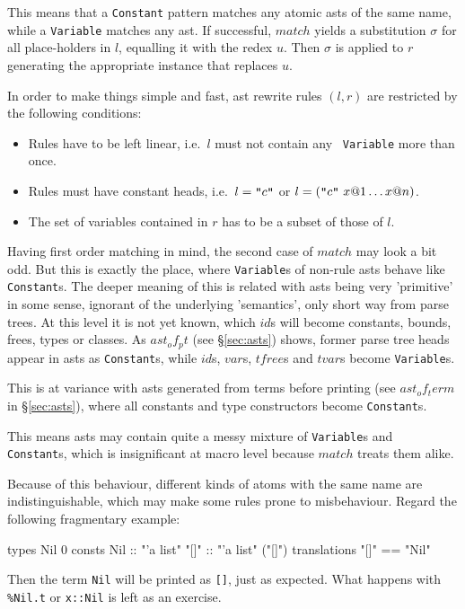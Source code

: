 This means that a {\tt Constant} pattern matches any atomic asts of the same
name, while a {\tt Variable} matches any ast. If successful, $match$ yields a
substitution $\sigma$ for all place-holders in $l$, equalling it with the
redex $u$. Then $\sigma$ is applied to $r$ generating the appropriate
instance that replaces $u$.

\medskip
In order to make things simple and fast, ast rewrite rules $(l, r)$ are
restricted by the following conditions:
\begin{itemize}
  \item Rules have to be left linear, i.e.\ $l$ must not contain any {\tt
    Variable} more than once.

  \item Rules must have constant heads, i.e.\ $l = \mbox{\tt "}c\mbox{\tt "}$ or $l =
    (\mbox{\tt "}c\mbox{\tt "} ~ x@1 \ldots x@n)$.

  \item The set of variables contained in $r$ has to be a subset of those of
    $l$.
\end{itemize}

\medskip
Having first order matching in mind, the second case of $match$ may look a
bit odd. But this is exactly the place, where {\tt Variable}s of non-rule
asts behave like {\tt Constant}s. The deeper meaning of this is related with
asts being very 'primitive' in some sense, ignorant of the underlying
'semantics', only short way from parse trees. At this level it is not yet
known, which $id$s will become constants, bounds, frees, types or classes. As
$ast_of_pt$ (see \S\ref{sec:asts}) shows, former parse tree heads appear in
asts as {\tt Constant}s, while $id$s, $var$s, $tfree$s and $tvar$s become
{\tt Variable}s.

This is at variance with asts generated from terms before printing (see
$ast_of_term$ in \S\ref{sec:asts}), where all constants and type constructors
become {\tt Constant}s.

\begin{warn}
This means asts may contain quite a messy mixture of {\tt Variable}s and {\tt
Constant}s, which is insignificant at macro level because $match$ treats them
alike.
\end{warn}

Because of this behaviour, different kinds of atoms with the same name are
indistinguishable, which may make some rules prone to misbehaviour. Regard
the following fragmentary example:
\begin{ttbox}
types
  Nil 0
consts
  Nil     :: "'a list"
  "[]"    :: "'a list"    ("[]")
translations
  "[]"    == "Nil"
\end{ttbox}
Then the term {\tt Nil} will be printed as {\tt []}, just as expected. What
happens with \verb|%Nil.t| or {\tt x::Nil} is left as an exercise.


